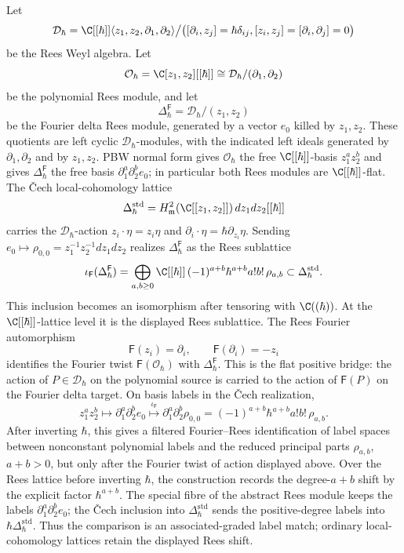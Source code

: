 \begin{thm}
\label{thm:app-matlis-rees-fourier-bridge}
  Let
  \[
    \mathcal D_\hbar
    =
    \C[[\hbar]]
      \langle z_1,z_2,\partial_1,\partial_2\rangle
      \big/
      \bigl([\partial_i,z_j]=\hbar\delta_{ij},
      [z_i,z_j]=[\partial_i,\partial_j]=0\bigr)
  \]
  be the Rees Weyl algebra.  Let
  \[
    \mathcal O_\hbar=\C[z_1,z_2][[\hbar]]
      \cong\mathcal D_\hbar/(\partial_1,\partial_2)
  \]
  be the polynomial Rees module, and let
  \[
    \Delta^{\mathsf F}_\hbar=
      \mathcal D_\hbar/(z_1,z_2)
  \]
  be the Fourier delta Rees module, generated by a vector \(e_0\)
  killed by \(z_1,z_2\).  These quotients are left cyclic
  \(\mathcal D_\hbar\)-modules, with the indicated left ideals
  generated by \(\partial_1,\partial_2\) and by \(z_1,z_2\). PBW normal
  form gives \(\mathcal O_\hbar\) the free \(\C[[\hbar]]\)-basis
  \(z_1^az_2^b\) and gives \(\Delta^{\mathsf F}_\hbar\) the free basis
  \(\partial_1^a\partial_2^b e_0\); in particular both Rees modules are
  \(\C[[\hbar]]\)-flat.  The \v{C}ech local-cohomology lattice
  \[
    \Delta^{\mathrm{std}}_\hbar=
    H^2_{\mathfrak m}(\C[[z_1,z_2]])\,dz_1dz_2[[\hbar]]
  \]
  carries the \(\mathcal D_\hbar\)-action
  \(z_i\cdot\eta=z_i\eta\) and
  \(\partial_i\cdot\eta=\hbar\partial_{z_i}\eta\).  Sending
  \(e_0\mapsto\rho_{0,0}=z_1^{-1}z_2^{-1}dz_1dz_2\) realizes
  \(\Delta^{\mathsf F}_\hbar\) as the Rees sublattice
  \[
    \iota_{\mathsf F}(\Delta^{\mathsf F}_\hbar)
    =
    \bigoplus_{a,b\geq0}
      \C[[\hbar]]\,
      (-1)^{a+b}\hbar^{a+b}a!b!\,\rho_{a,b}
    \subset
    \Delta^{\mathrm{std}}_\hbar .
  \]
  This inclusion becomes an isomorphism after tensoring with
  \(\C((\hbar))\).  At the \(\C[[\hbar]]\)-lattice level it is the
  displayed Rees sublattice.  The Rees Fourier
  automorphism
  \[
    \mathsf F(z_i)=\partial_i,\qquad
    \mathsf F(\partial_i)=-z_i
  \]
  identifies the Fourier twist \(\mathsf F(\mathcal O_\hbar)\) with
  \(\Delta^{\mathsf F}_\hbar\).  This is the flat positive bridge: the
  action of \(P\in\mathcal D_\hbar\) on the polynomial source is carried
  to the action of \(\mathsf F(P)\) on the Fourier delta target.  On basis
  labels in the \v{C}ech
  realization,
  \[
    z_1^az_2^b
    \longmapsto
    \partial_1^a\partial_2^b e_0
    \overset{\iota_{\mathsf F}}{\longmapsto}
    \partial_1^a\partial_2^b\rho_{0,0}
    =
    (-1)^{a+b}\hbar^{a+b}a!b!\,\rho_{a,b}.
  \]
  After inverting \(\hbar\), this gives a filtered Fourier--Rees
  identification of label spaces between nonconstant polynomial labels and
  the reduced principal parts \(\rho_{a,b}\), \(a+b>0\), but only after the
  Fourier twist of action displayed above.  Over the Rees lattice before
  inverting \(\hbar\), the construction records the degree-\(a+b\) shift
  by the explicit factor \(\hbar^{a+b}\).  The special fibre of the
  abstract Rees module keeps the labels
  \(\partial_1^a\partial_2^be_0\); the \v{C}ech inclusion into
  \(\Delta^{\mathrm{std}}_\hbar\) sends the positive-degree labels into
  \(\hbar\Delta^{\mathrm{std}}_\hbar\).  Thus the comparison is an
  associated-graded label match; ordinary local-cohomology lattices
  retain the displayed Rees shift.


\end{thm}
